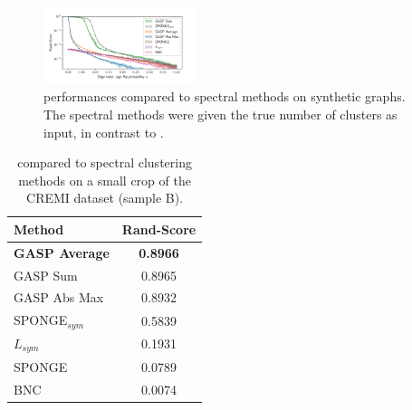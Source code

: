 \begin{figure}
\centering
        \includegraphics[width=0.4\textwidth,trim=0.25in 0.25in 0.68in 0.36in,clip]{./figs/SSBM_experiments.pdf} %
        \caption{\algname{} performances compared to spectral methods on synthetic graphs. The spectral methods were given the true number of clusters as input, in contrast to \algname{}.}
    \label{fig:SSBM_spectral_experiments}
\end{figure}
\begin{table}
\centering
\footnotesize
\begin{tabular}{l|c}
           Method & Rand-Score \\ \midrule
           \textbf{GASP Average} & \textbf{0.8966} \\
GASP Sum & 0.8965 \\
GASP Abs Max & 0.8932 \\
SPONGE$_{sym}$ \cite{Cucuringu2019SPONGEAG} & 0.5839\\
$L_{sym}$ \cite{kunegis2010spectral} & 0.1931 \\
SPONGE \cite{Cucuringu2019SPONGEAG} & 0.0789 \\
BNC \cite{chiang2012scalable} & 0.0074 \\
        \end{tabular}
    \caption{\algname{} compared to spectral clustering methods on a small crop of the CREMI dataset (sample B).}
    \label{tab:cremi_spectral_experiments}
\end{table}
